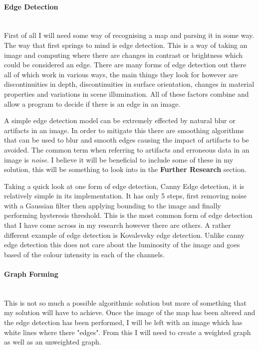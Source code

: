 \begin{FlushLeft}
            \paragraph{Edge Detection} \mbox{} \\
            First of all I will need some way of recognising a map and parsing it in some way. The way that first springs to mind is edge detection. This is a way of taking an image and computing where there
            are changes in contrast or brightness which could be considered an edge. There are many forms of edge detection out there all of which work in various ways, the main things they look for however
            are discontinuities in depth, discontinuities in surface orientation, changes in material properties and variations in scene illumination. All of these factors combine and allow a program to decide
            if there is an edge in an image. \\ \bk

            A simple edge detection model can be extremely effected by natural blur or artifacts in an image. In order to mitigate this there are smoothing algorithms that can be used to blur and smooth edges
            causing the impact of artifacts to be avoided. The common term when referring to artifacts and erroneous data in an image is \emph{noise}. I believe it will be beneficial to include some of these
            in my solution, this will be something to look into in the \textbf{Further Research} section. \\ \bk

            Taking a quick look at one form of edge detection, Canny Edge detection, it is relatively simple in its implementation. It has only 5 steps, first removing noise with a Gaussian filter then applying
            bounding to the image and finally performing hysteresis threshold. This is the most common form of edge detection that I have come across in my research however there are others. A rather
            different example of edge detection is Kovalevsky edge detection. Unlike canny edge detection this does not care about the luminosity of the image and goes based of the colour intensity in each
            of the channels. \\ \bk

            \paragraph{Graph Forming} \mbox{} \\
            This is not so much a possible algorithmic solution but more of something that my solution will have to achieve. Once the image of the map has been altered and the edge detection has been 
            performed, I will be left with an image which has white lines where there "edges". From this I will need to create a weighted graph as well as an unweighted graph. \\ \bk
            

\end{FlushLeft}
